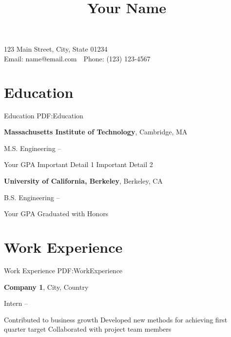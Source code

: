 \documentclass[letterpaper,9pt,oneside]{article}
\begin{document}

\title{Your Name}

\begin{subtitle}
\par
\vspace{1mm}
123 Main Street, City, State 01234\\
Email: name@email.com
\,\BulletSymbol\,
Phone: (123) 123-4567
\end{subtitle}

\begin{body}


\section
{Education}
{Education}
{PDF:Education}

\textbf{Massachusetts Institute of Technology},
Cambridge, MA
\par
M.S. Engineering
\hfill
{} --
\begin{detail}
\SmallEntryGap
\BulletItem
Your GPA
\BulletItem
Important Detail 1
\BulletItem
Important Detail 2
\end{detail}


\EntryGap
\textbf{University of California, Berkeley},
Berkeley, CA
\par
B.S. Engineering
\hfill
{} --
\begin{detail}
\SmallEntryGap
\BulletItem
Your GPA
\BulletItem
Graduated with Honors
\end{detail}


\section
{Work Experience}
{Work Experience}
{PDF:WorkExperience}

\textbf{Company 1}, City, Country
\par
Intern
\hfill
{} --
\begin{detail}
\SmallEntryGap
\BulletItem
Contributed to business growth
\BulletItem
Developed new methods for achieving first quarter target
\BulletItem
Collaborated with project team members
\end{detail}


\end{body}
\end{document}
